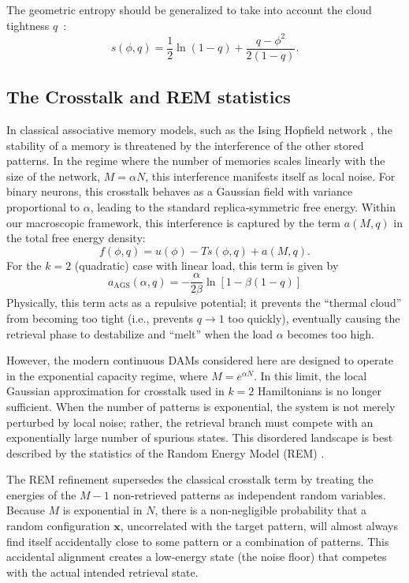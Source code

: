 \documentclass{article}
\theoremstyle{plain}
\theoremstyle{definition}
\theoremstyle{remark}
\begin{document}
The geometric entropy should be generalized to take into account the cloud tightness $q$~\cite{gardner1988space}:
\begin{equation}
    s(\phi, q) = \frac{1}{2} \ln(1-q) + \frac{q - \phi^2}{2(1-q)}.
\end{equation}

\subsection{The Crosstalk and REM statistics}

In classical associative memory models, such as the Ising Hopfield network \cite{amit1987statistical}, the stability of a memory is threatened by the interference of the other stored patterns. In the regime where the number of memories scales linearly with the size of the network, $M = \alpha N$, this interference manifests itself as local noise. For binary neurons, this crosstalk behaves as a Gaussian field with variance proportional to $\alpha$, leading to the standard replica-symmetric free energy. Within our macroscopic framework, this interference is captured by the term $a(M, q)$ in the total free energy density:
\begin{equation}
    f(\phi, q) = u(\phi) - T s(\phi, q) + a(M, q).
    \label{eq:total_free_energy}
\end{equation}
For the $k=2$ (quadratic) case with linear load, this term is given by 
\begin{equation}
    a_{\text{AGS}}(\alpha, q) = -\frac{\alpha}{2\beta} \ln [1 - \beta(1 - q)]
\end{equation}
Physically, this term acts as a repulsive potential; it prevents the ``thermal cloud'' from becoming too tight (i.e., prevents $q \to 1$ too quickly), eventually causing the retrieval phase to destabilize and ``melt'' when the load $\alpha$ becomes too high.

However, the modern continuous DAMs considered here are designed to operate in the exponential capacity regime, where $M = e^{\alpha N}$. In this limit, the local Gaussian approximation for crosstalk used in $k=2$ Hamiltonians is no longer sufficient. When the number of patterns is exponential, the system is not merely perturbed by local noise; rather, the retrieval branch must compete with an exponentially large number of spurious states. This disordered landscape is best described by the statistics of the Random Energy Model (REM) \cite{derrida1980random}.

The REM refinement supersedes the classical crosstalk term by treating the energies of the $M-1$ non-retrieved patterns as independent random variables. Because $M$ is exponential in $N$, there is a non-negligible probability that a random configuration $\mathbf{x}$, uncorrelated with the target pattern, will almost always find itself accidentally close to some pattern or a combination of patterns. This accidental alignment creates a low-energy state (the noise floor) that competes with the actual intended retrieval state.
\end{document}
